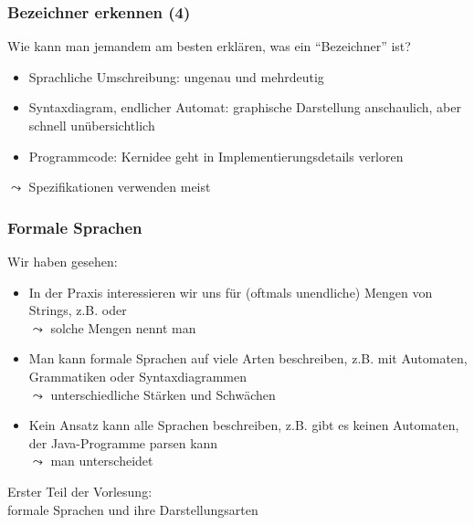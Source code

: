 \documentclass[onlymath]{beamer}
\begin{document}
\begin{frame}\frametitle{Bezeichner erkennen (4)}

Wie kann man jemandem am besten erklären, was ein "`Bezeichner"' ist?
\begin{itemize}
\item \alert{Sprachliche Umschreibung}: ungenau und mehrdeutig
\item \alert{Syntaxdiagram}, \alert{endlicher Automat}: graphische Darstellung anschaulich, aber schnell unübersichtlich
\item \alert{Programmcode}: Kernidee geht in Implementierungsdetails verloren
\end{itemize}
\pause
$\leadsto$ Spezifikationen verwenden meist 


\end{frame}

\begin{frame}\frametitle{Formale Sprachen}

Wir haben gesehen:
\begin{itemize}
\item In der Praxis interessieren wir uns für (oftmals unendliche) Mengen von Strings, z.B.  oder \\
$\leadsto$ solche Mengen nennt man 
\item Man kann formale Sprachen auf viele Arten beschreiben, z.B. mit Automaten, Grammatiken oder Syntaxdiagrammen\\
$\leadsto$ unterschiedliche Stärken und Schwächen
\item Kein Ansatz kann alle Sprachen beschreiben, z.B. gibt es keinen Automaten, der Java-Programme parsen kann\\
$\leadsto$ man unterscheidet 
\end{itemize}

Erster Teil der Vorlesung:\\
formale Sprachen und ihre Darstellungsarten

\end{frame}
\end{document}
